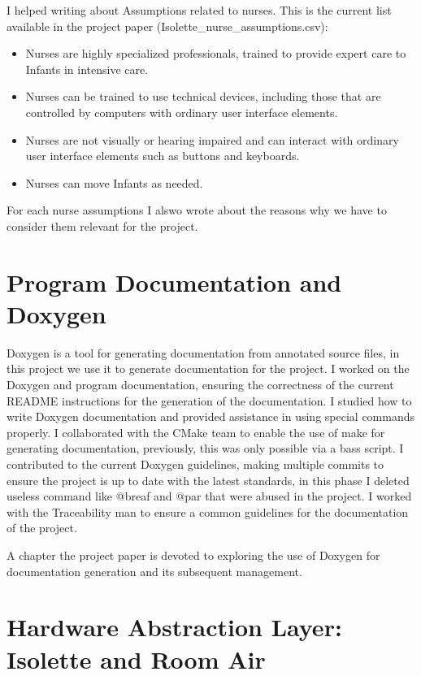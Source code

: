 \documentclass[a4paper, 12pt]{article}
\begin{document}
I helped writing about Assumptions related to nurses. 
This is the current list available in the project paper (Isolette\_nurse\_assumptions.csv):

\begin{itemize}
    \item Nurses are highly specialized professionals, trained to provide expert care to Infants in intensive care.
    \item Nurses can be trained to use technical devices, including those that are controlled by computers with ordinary user interface elements.
    \item Nurses are not visually or hearing impaired and can interact with ordinary user interface elements such as buttons and keyboards.
    \item Nurses can move Infants as needed.
\end{itemize}

For each nurse assumptions I alswo wrote about the reasons why we have to consider them relevant for the project.

\section{Program Documentation and Doxygen}

Doxygen is a tool for generating documentation from annotated source files, in this project we use it to generate documentation for the project.
I worked on the Doxygen and program documentation, ensuring the correctness of the current README instructions for the generation of the documentation.
I studied how to write Doxygen documentation and provided assistance in using special commands properly.
I collaborated with the CMake team to enable the use of make for generating documentation, previously, this was only possible via a bass script. 
I contributed to the current Doxygen guidelines, making multiple commits to ensure the project is up to date with the latest standards, 
in this phase I deleted useless command like @breaf and @par that were abused in the project.
I worked with the Traceability man to ensure a common guidelines for the documentation of the project.

A chapter the project paper is devoted to exploring the use of Doxygen for documentation generation and its subsequent management.

\section{Hardware Abstraction Layer: Isolette and Room Air}
\end{document}

